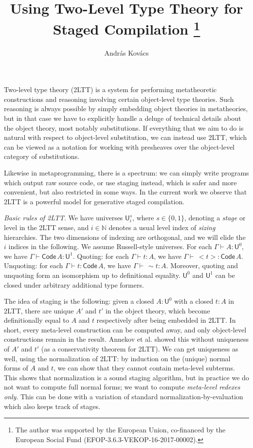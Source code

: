 \documentclass{easychair}
\title{Using Two-Level Type Theory for Staged Compilation %
  \thanks{The author was supported by the European Union, co-financed
    by the European Social Fund (EFOP-3.6.3-VEKOP-16-2017-00002).}}
\author{
Andr\'as Kov\'acs
}
\institute{
  E\"otv\"os Lor\'and University,
  Budapest, Hungary \\
  \email{kovacsandras@inf.elte.hu}
}
\newcommand{\U}{\mathsf{U}}
\newcommand{\Code}{\mathsf{Code}}
\begin{document}
\maketitle

Two-level type theory \cite{twolevel} (2LTT) is a system for performing
metatheoretic constructions and reasoning involving certain object-level type
theories. Such reasoning is always possible by simply embedding object theories
in metatheories, but in that case we have to explicitly handle a deluge of
technical details about the object theory, most notably substitutions. If
everything that we aim to do is natural with respect to object-level
substitution, we can instead use 2LTT, which can be viewed as a notation for
working with presheaves over the object-level category of substitutions.

Likewise in metaprogramming, there is a spectrum: we can simply write programs
which output raw source code, or use staging instead, which is safer and more
convenient, but also restricted in some ways. In the current work we observe
that 2LTT is a powerful model for generative staged compilation.

\emph{Basic rules of 2LTT}. We have universes $\U^s_{i}$, where $s \in \{0,1\}$,
denoting a \emph{stage} or level in the 2LTT sense, and $i \in \mathbb{N}$
denotes a usual level index of \emph{sizing} hierarchies. The two dimensions of
indexing are orthogonal, and we will elide the $i$ indices in the following. We
assume Russell-style universes. For each $\Gamma \vdash A : \U^0$, we have
$\Gamma \vdash \Code\,A : \U^1$. Quoting: for each $\Gamma \vdash t : A$, we
have $\Gamma \vdash\,<\!t\!> : \Code\,A$. Unquoting: for each $\Gamma \vdash t :
\Code\,A$, we have $\Gamma \vdash\,\sim\!t : A$. Moreover, quoting and unquoting
form an isomorphism up to definitional equality. $\U^0$ and $\U^1$ can be closed
under arbitrary additional type formers.

The idea of staging is the following: given a closed $A : \U^0$ with a closed $t
: A$ in 2LTT, there are unique $A'$ and $t'$ in the object theory, which become
definitionally equal to $A$ and $t$ respectively after being embedded in
2LTT. In short, every meta-level construction can be computed away, and only
object-level constructions remain in the result. Annekov et al. \cite{twolevel}
showed this without uniqueness of $A'$ and $t'$ (as a conservativity theorem for
2LTT). We can get uniqueness as well, using the normalization of 2LTT: by
induction on the (unique) normal forms of $A$ and $t$, we can show that they
cannot contain meta-level subterms. This shows that normalization is a sound
staging algorithm, but in practice we do not want to compute full normal forms;
we want to compute \emph{meta-level redexes only}. This can be done with a
variation of standard normalization-by-evaluation \cite{abel2013normalization,
  Wieczorek:2018:CFN:3176245.3167091} which also keeps track of stages.
\end{document}

